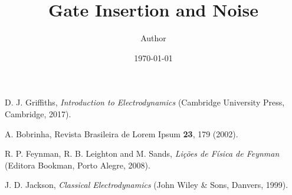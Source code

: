 \documentclass[a4paper, amsfonts, amssymb, amsmath, reprint, showkeys, nofootinbib, twoside]{revtex4-1}
\begin{document}
\title{Gate Insertion and Noise}

\author{Author}

\date{\today} %

\begin{abstract}

\end{abstract}



\maketitle





\begin{thebibliography}{4}
D. J. Griffiths,
\textit{Introduction to Electrodynamics}
(Cambridge University Press, Cambridge, 2017).

A. Bobrinha,
Revista Brasileira de Lorem Ipsum \textbf{23},
179 (2002).

R. P. Feynman, R. B. Leighton and M. Sands,
\textit{Lições de Física de Feynman}
(Editora Bookman, Porto Alegre, 2008).

J. D. Jackson,
\textit{Classical Electrodynamics}
(John Wiley \& Sons, Danvers, 1999).
\end{thebibliography}

\appendix*

\end{document}
